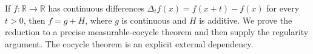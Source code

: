 If \(f:\mathbb R\to\mathbb R\) has continuous differences
\(\Delta_t f(x)=f(x+t)-f(x)\) for every \(t>0\), then
\(f=g+H\), where \(g\) is continuous and \(H\) is additive.
We prove the reduction to a precise measurable-cocycle
theorem and then supply the regularity argument.
The cocycle theorem is an explicit external dependency.
